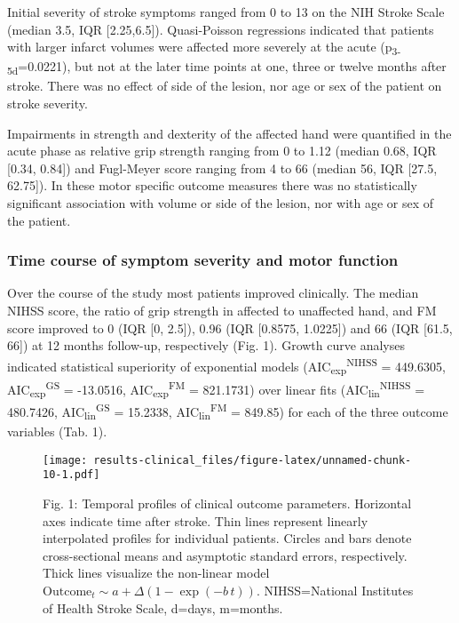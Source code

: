 \documentclass[]{article}
\begin{document}
Initial severity of stroke symptoms ranged from 0 to 13 on the NIH
Stroke Scale (median 3.5, IQR {[}2.25,6.5{]}). Quasi-Poisson regressions
indicated that patients with larger infarct volumes were affected more
severely at the acute (p\textsubscript{3-5d}=0.0221), but not at the
later time points at one, three or twelve months after stroke. There was
no effect of side of the lesion, nor age or sex of the patient on stroke
severity.

Impairments in strength and dexterity of the affected hand were
quantified in the acute phase as relative grip strength ranging from 0
to 1.12 (median 0.68, IQR {[}0.34, 0.84{]}) and Fugl-Meyer score ranging
from 4 to 66 (median 56, IQR {[}27.5, 62.75{]}). In these motor specific
outcome measures there was no statistically significant association with
volume or side of the lesion, nor with age or sex of the patient.

\hypertarget{time-course-of-symptom-severity-and-motor-function}{%
\subsubsection{Time course of symptom severity and motor
function}\label{time-course-of-symptom-severity-and-motor-function}}

Over the course of the study most patients improved clinically. The
median NIHSS score, the ratio of grip strength in affected to unaffected
hand, and FM score improved to 0 (IQR {[}0, 2.5{]}), 0.96 (IQR
{[}0.8575, 1.0225{]}) and 66 (IQR {[}61.5, 66{]}) at 12 months
follow-up, respectively (Fig. 1). Growth curve analyses indicated
statistical superiority of exponential models
(AIC\textsubscript{exp}\textsuperscript{NIHSS} = 449.6305,
AIC\textsubscript{exp}\textsuperscript{GS} = -13.0516,
AIC\textsubscript{exp}\textsuperscript{FM} = 821.1731) over linear fits
(AIC\textsubscript{lin}\textsuperscript{NIHSS} = 480.7426,
AIC\textsubscript{lin}\textsuperscript{GS} = 15.2338,
AIC\textsubscript{lin}\textsuperscript{FM} = 849.85) for each of the
three outcome variables (Tab. 1).

\begin{figure}
\centering
\texttt{[image: results-clinical\_files/figure-latex/unnamed-chunk-10-1.pdf]}
\caption{Fig. 1: Temporal profiles of clinical outcome parameters.
Horizontal axes indicate time after stroke. Thin lines represent
linearly interpolated profiles for individual patients. Circles and bars
denote cross-sectional means and asymptotic standard errors,
respectively. Thick lines visualize the non-linear model
\(\mathrm{Outcome}_t\sim a + \Delta(1-\exp(-b\,t))\). NIHSS=National
Institutes of Health Stroke Scale, d=days, m=months.}
\end{figure}
\end{document}
